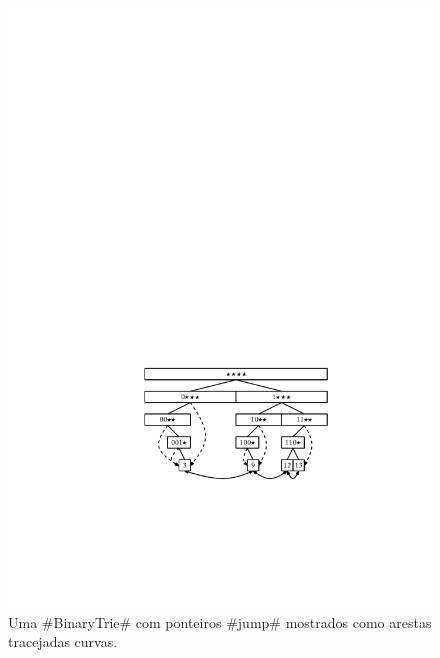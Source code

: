 \begin{figure}
  \begin{center}
    \includegraphics[width=\ScaleIfNeeded]{figs/binarytrie-ex-2}
  \end{center}
  \caption[A BinaryTrie]{Uma #BinaryTrie# com ponteiros #jump#  mostrados como arestas tracejadas curvas.}
\end{figure}



